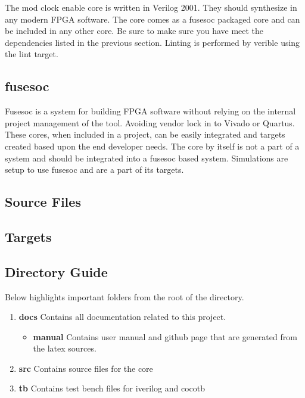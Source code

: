 \par
The mod clock enable core is written in Verilog 2001. They should synthesize in any modern FPGA software. The core comes as a fusesoc packaged core and can be included in any other core. Be sure to make sure you have meet the dependencies listed in the previous section. Linting is performed by verible using the lint target.

\subsection{fusesoc}
\par
Fusesoc is a system for building FPGA software without relying on the internal project management of the tool. Avoiding vendor lock in to Vivado or Quartus.
These cores, when included in a project, can be easily integrated and targets created based upon the end developer needs. The core by itself is not a part of
a system and should be integrated into a fusesoc based system. Simulations are setup to use fusesoc and are a part of its targets.

\subsection{Source Files}



\subsection{Targets}



\subsection{Directory Guide}

\par
Below highlights important folders from the root of the directory.

\begin{enumerate}
  \item \textbf{docs} Contains all documentation related to this project.
    \begin{itemize}
      \item \textbf{manual} Contains user manual and github page that are generated from the latex sources.
    \end{itemize}
  \item \textbf{src} Contains source files for the core
  \item \textbf{tb} Contains test bench files for iverilog and cocotb
\end{enumerate}

